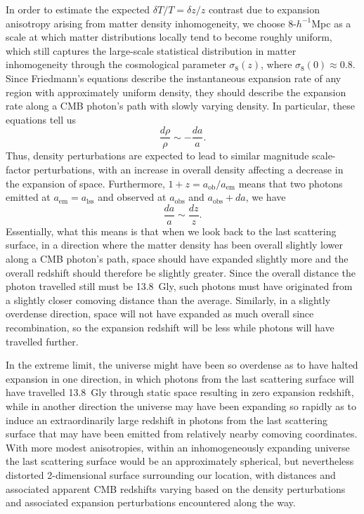 \documentclass[aps,prd,reprint,superscriptaddress]{revtex4-2}
\begin{document}
In order to estimate the expected $\delta T/T=\delta z/z$ contrast due to expansion anisotropy arising from matter density inhomogeneity, we choose 8-$h^{-1}$Mpc as a scale at which matter distributions locally tend to become roughly uniform, which still captures the large-scale statistical distribution in matter inhomogeneity through the cosmological parameter $\sigma_8(z)$, where $\sigma_8(0)\approx0.8$. Since Friedmann's equations describe the instantaneous expansion rate of any region with approximately uniform density, they should describe the expansion rate along a CMB photon's path with slowly varying density. In particular, these equations tell us 
\begin{equation}
    \frac{d\rho}{\rho}\sim -\frac{da}{a}.
\end{equation}
Thus, density perturbations are expected to lead to similar magnitude scale-factor perturbations, with an increase in overall density affecting a decrease in the expansion of space. Furthermore, $1+z=a_{\mathrm{ob}}/a_{\mathrm{em}}$ means that two photons emitted at $a_{\mathrm{em}}=a_{\mathrm{lss}}$ and observed at $a_{\mathrm{obs}}$ and $a_{\mathrm{obs}}+da$, we have
\begin{equation}
    \frac{da}{a}\sim\frac{dz}{z}.
\end{equation}
Essentially, what this means is that when we look back to the last scattering surface, in a direction where the matter density has been overall slightly lower along a CMB photon's path, space should have expanded slightly more and the overall redshift should therefore be slightly greater. Since the overall distance the photon travelled still must be 13.8~Gly, such photons must have originated from a slightly closer comoving distance than the average. Similarly, in a slightly overdense direction, space will not have expanded as much overall since recombination, so the expansion redshift will be less while photons will have travelled further. 

In the extreme limit, the universe might have been so overdense as to have halted expansion in one direction, in which photons from the last scattering surface will have travelled 13.8~Gly through static space resulting in zero expansion redshift, while in another direction the universe may have been expanding so rapidly as to induce an extraordinarily large redshift in photons from the last scattering surface that may have been emitted from relatively nearby comoving coordinates. With more modest anisotropies, within an inhomogeneously expanding universe the last scattering surface would be an approximately spherical, but nevertheless distorted 2-dimensional surface surrounding our location, with distances and associated apparent CMB redshifts varying based on the density perturbations and associated expansion perturbations encountered along the way.
\end{document}
